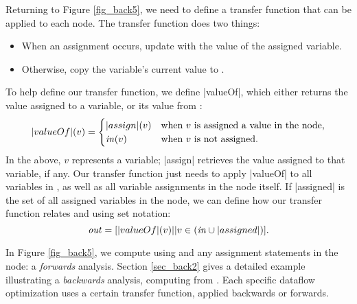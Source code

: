 \documentclass[12pt]{report}
\begin{document}
Returning to Figure \ref{fig_back5}, we need to define a transfer
function that can be applied to each node. The transfer function does
two things:
\begin{itemize}
\item When an assignment occurs, update \out with the value of the assigned variable.
\item Otherwise, copy the variable's current value to \out.
\end{itemize}
To help define our transfer function, we define |valueOf|,
which either returns the value assigned to a variable, or its value
from \inE:
\begin{equation} |valueOf|(v) = 
  \begin{cases}
    |assign|(v) & \text{when $v$ is assigned a value in the node,} \\
    \text{\emph{in}}(v) & \text{when $v$ is not assigned.} 
  \end{cases}
\label{eqn_back2}
\end{equation}
In the above, $v$ represents a variable; |assign| retrieves the value
assigned to that variable, if any.  Our transfer function just needs
to apply |valueOf| to all variables in \inE, as well as all
variable assignments in the node itself. If |assigned| is the set of
all assigned variables in the node, we can define how our transfer
function relates \inE and \out using set notation:
\begin{equation}
  \text{\emph{out}} = [|valueOf|(v) || v \in (\text{\emph{in}} \cup |assigned|)].
\end{equation}

In Figure \ref{fig_back5}, we compute \out using \inE and any
assignment statements in the node: a \emph{forwards} analysis. Section
\ref{sec_back2} gives a detailed example illustrating a
\emph{backwards} analysis, computing \inE from \out. Each specific
dataflow optimization uses a certain transfer function, applied
backwards or forwards.



\end{document}
